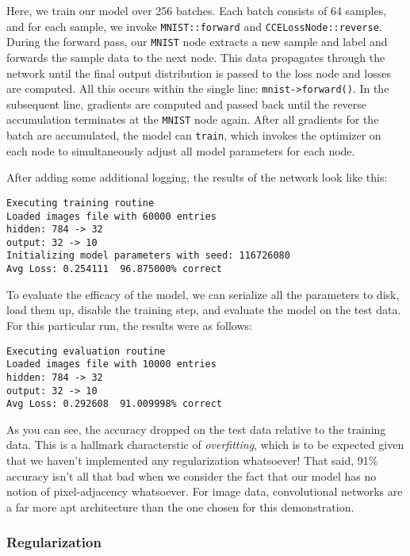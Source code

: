 \documentclass[
]{article}
\begin{document}
Here, we train our model over 256 batches. Each batch consists of 64
samples, and for each sample, we invoke \texttt{MNIST::forward} and
\texttt{CCELossNode::reverse}. During the forward pass, our
\texttt{MNIST} node extracts a new sample and label and forwards the
sample data to the next node. This data propagates through the network
until the final output distribution is passed to the loss node and
losses are computed. All this occurs within the single line:
\texttt{mnist-\textgreater{}forward()}. In the subsequent line,
gradients are computed and passed back until the reverse accumulation
terminates at the \texttt{MNIST} node again. After all gradients for the
batch are accumulated, the model can \texttt{train}, which invokes the
optimizer on each node to simultaneously adjust all model parameters for
each node.

After adding some additional logging, the results of the network look
like this:

\begin{verbatim}
Executing training routine
Loaded images file with 60000 entries
hidden: 784 -> 32
output: 32 -> 10
Initializing model parameters with seed: 116726080
Avg Loss: 0.254111  96.875000% correct
\end{verbatim}

To evaluate the efficacy of the model, we can serialize all the
parameters to disk, load them up, disable the training step, and
evaluate the model on the test data. For this particular run, the
results were as follows:

\begin{verbatim}
Executing evaluation routine
Loaded images file with 10000 entries
hidden: 784 -> 32
output: 32 -> 10
Avg Loss: 0.292608  91.009998% correct
\end{verbatim}

As you can see, the accuracy dropped on the test data relative to the
training data. This is a hallmark characterstic of \emph{overfitting},
which is to be expected given that we haven't implemented any
regularization whatsoever! That said, 91\% accuracy isn't all that bad
when we consider the fact that our model has no notion of
pixel-adjacency whatsoever. For image data, convolutional networks are a
far more apt architecture than the one chosen for this demonstration.

\hypertarget{regularization}{%
\subsubsection{Regularization}\label{regularization}}
\end{document}
